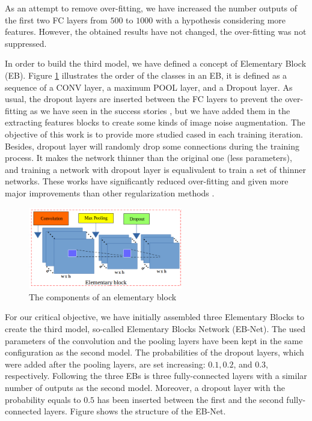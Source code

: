 \documentclass[review]{elsarticle}
\begin{document}
As an attempt to remove over-fitting, we have increased the number outputs of the first two FC layers from $500$ to $1000$ with a hypothesis considering more features. However, the obtained results have not changed, the over-fitting was not suppressed.

In order to build the third model, we have defined a concept of Elementary Block (EB). Figure \ref{figeblock} illustrates the order of the classes in an EB, it is defined as a sequence of a CONV layer, a maximum POOL layer, and a Dropout layer. As usual, the dropout layers are inserted between the FC layers to prevent the over-fitting as we have seen in the success stories \cite{}, but we have added them in the extracting features blocks to create some kinds of image noise augmentation. The objective of this work is to provide more studied cased in each training iteration. Besides, dropout layer will randomly drop some connections during the training process. It makes the network thinner than the original one (less parameters), and training a network with dropout layer is equalivalent to train a set of thinner networks. These works have significantly reduced over-fitting and given more major improvements than other regularization methods \cite{}.

\begin{figure}[h!]
	\centering
	\includegraphics[width=0.6\textwidth]{images/elementary_block}
	\caption{The components of an elementary block}
	\label{figeblock}
\end{figure}

For our critical objective, we have initially assembled three Elementary Blocks to create the third model, so-called Elementary Blocks Network (EB-Net). The used parameters of the convolution and the pooling layers have been kept in the same configuration as the second model. The probabilities of the dropout layers, which were added after the pooling layers, are set increasing: $0.1, 0.2$, and $0.3$, respectively. Following the three EBs is three fully-connected layers with a similar number of outputs as the second model. Moreover, a dropout layer with the probability equals to $0.5$ has been inserted between the first and the second fully-connected layers. Figure \cite{figebnet} shows the structure of the EB-Net.
\end{document}
